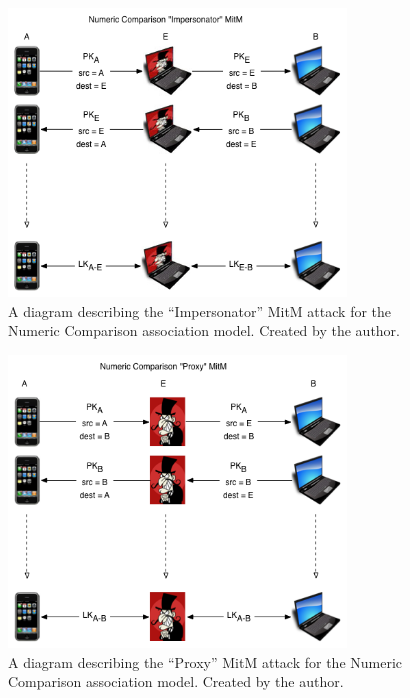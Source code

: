 \documentclass{acm_proc_article-sp}
\begin{document}
\begin{figure}
    \begin{center}
        \includegraphics[width=0.8\textwidth]{diagrams/nc_impersonator_mitm.png}
        \caption{A diagram describing the ``Impersonator'' MitM attack for the Numeric Comparison association model. Created by the author.}
        \label{nc_impersonator_mitm}
    \end{center}
\end{figure}

\begin{figure}
    \begin{center}
        \includegraphics[width=0.8\textwidth]{diagrams/nc_proxy_mitm.png}
        \caption{A diagram describing the ``Proxy'' MitM attack for the Numeric Comparison association model. Created by the author.}
        \label{nc_proxy_mitm}
    \end{center}
\end{figure}

\balancecolumns
\end{document}
